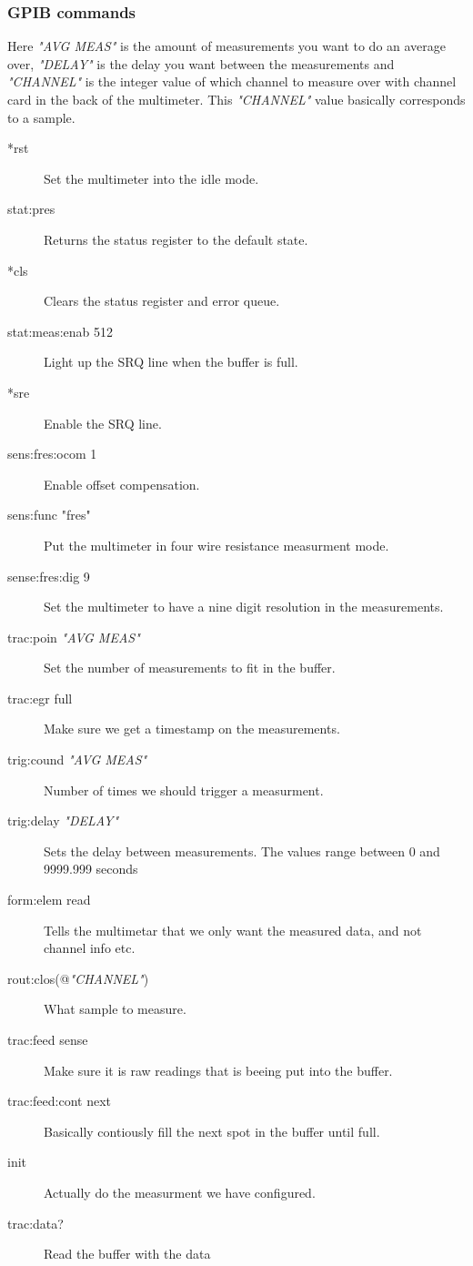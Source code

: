 \documentclass[a4paper,12pt]{article}
\begin{document}
\subsubsection{GPIB commands}
Here \emph{"AVG MEAS"} is the amount of measurements you want to do an average over, \emph{"DELAY"} is the delay you want between the measurements and \emph{"CHANNEL"} is the integer value of which channel to measure over with channel card in the back of the multimeter. This \emph{"CHANNEL"} value basically corresponds to a sample.
\begin{description}
\item [*rst] Set the multimeter into the idle mode.
\item [stat:pres] Returns the status register to the default state.
\item [*cls] Clears the status register and error queue. 
\item [stat:meas:enab 512] Light up the SRQ line when the buffer is full.
\item [*sre] Enable the SRQ line.
\item [sens:fres:ocom 1] Enable offset compensation.
\item [sens:func "fres"] Put the multimeter in four wire resistance measurment mode.
\item [sense:fres:dig 9] Set the multimeter to have a nine digit resolution in the measurements.
\item [trac:poin \emph{"AVG MEAS"}] Set the number of measurements to fit in the buffer.
\item [trac:egr full] Make sure we get a timestamp on the measurements.
\item [trig:cound \emph{"AVG MEAS"}] Number of times we should trigger a measurment.
\item [trig:delay \emph{"DELAY"}] Sets the delay between measurements. The values range between 0 and 9999.999 seconds
\item [form:elem read] Tells the multimetar that we only want the measured data, and not channel info etc.
\item [rout:clos(@\emph{"CHANNEL"})] What sample to measure.
\item [trac:feed sense] Make sure it is raw readings that is beeing put into the buffer.
\item [trac:feed:cont next] Basically contiously fill the next spot in the buffer until full.
\item [init] Actually do the measurment  we have configured.
\item [trac:data?] Read the buffer with the data
\end{description}
\end{document}
